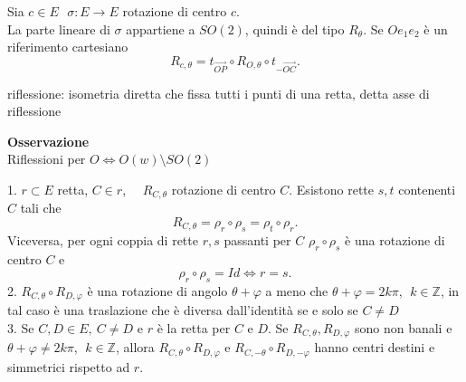 \documentclass[12px]{article}
\begin{document}
\newpage
Sia $c\in E\ \ \ \sigma : E \rightarrow E$  rotazione di centro $c$.\\
La parte lineare di $\sigma$ appartiene a $SO(2)$, quindi è del tipo $R_\theta$. Se $Oe_1e_2$ è un riferimento cartesiano
\[
	R_{c,\theta} = t_{\overrightarrow{OP}}\circ R_{O,\theta} \circ t_{-\overrightarrow{OC}}
.\] 
\begin{nome}
	riflessione: isometria diretta che fissa tutti i punti di una retta, detta asse di riflessione
\end{nome}
\textbf{Osservazione}\\
Riflessioni per $O  \Leftrightarrow O(w)\setminus SO(2)$
\begin{lemm}
	1. $r\subset E$ retta, $C\in r$, \ \  $R_{C,\theta}$ rotazione di centro $C$. Esistono rette $s,t$ contenenti $C$ tali che 
	\[
		R_{C,\theta} = \rho_r\circ\rho_s=\rho_t\circ\rho_r
	.\] 
	Viceversa, per ogni coppia di rette $r,s$ passanti per $C$ $\rho_r\circ\rho_s$ è una rotazione di centro $C$ e \[\rho_r\circ\rho_s = Id \Leftrightarrow r = s.\]
	2. $R_{C,\theta}\circ R_{D,\varphi}$ è una rotazione di angolo $\theta + \varphi$ a meno che $\theta + \varphi = 2k\pi,\ \ k\in\mathbb{Z}$, in tal caso è una traslazione che è diversa dall'identità se e solo se $C\neq D$\\
	3. Se $C,D\in E, \ C\neq D$ e $r$ è la retta per $C$ e $D$. Se $R_{C,\theta}, R_{D,\varphi}$ sono non banali e $\theta + \varphi\neq 2k\pi, \ \ k\in \mathbb{Z}$, allora $R_{C,\theta}\circ R_{D,\varphi}$ e $R_{C,-\theta}\circ R_{D,-\varphi}$ hanno centri destini e simmetrici rispetto ad $r$.
\end{lemm}
\end{document}
